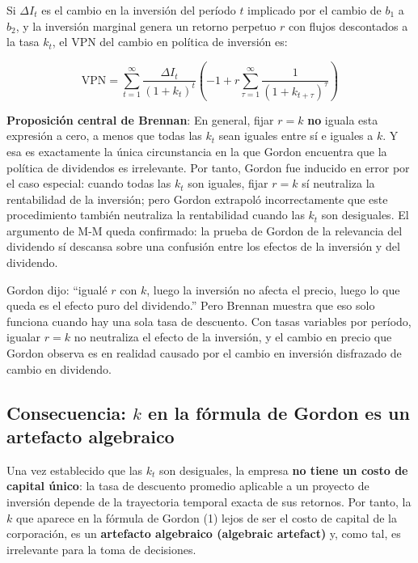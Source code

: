 \documentclass[12pt]{article}
\begin{document}
Si $\Delta I_t$ es el cambio en la inversi\'on del per\'iodo $t$ implicado por el cambio de $b_1$ a $b_2$, y la inversi\'on marginal genera un retorno perpetuo $r$ con flujos descontados a la tasa $k_t$, el VPN del cambio en pol\'itica de inversi\'on es:

\[
\text{VPN} = \sum_{t=1}^{\infty} \frac{\Delta I_t}{(1+k_t)^t}\left(-1 + r\sum_{\tau=1}^{\infty} \frac{1}{(1+k_{t+\tau})^{\tau}}\right)
\]

\begin{explicacion}
\textbf{Proposici\'on central de Brennan}: En general, fijar $r = k$ \textbf{no} iguala esta expresi\'on a cero, a menos que todas las $k_t$ sean iguales entre s\'i e iguales a $k$. Y esa es exactamente la \'unica circunstancia en la que Gordon encuentra que la pol\'itica de dividendos es irrelevante. Por tanto, Gordon fue inducido en error por el caso especial: cuando todas las $k_t$ son iguales, fijar $r = k$ s\'i neutraliza la rentabilidad de la inversi\'on; pero Gordon extrapoló incorrectamente que este procedimiento tambi\'en neutraliza la rentabilidad cuando las $k_t$ son desiguales. El argumento de M-M queda confirmado: la prueba de Gordon de la relevancia del dividendo s\'i descansa sobre una confusi\'on entre los efectos de la inversi\'on y del dividendo.
\end{explicacion}

\begin{intuicion}
Gordon dijo: ``igualé $r$ con $k$, luego la inversi\'on no afecta el precio, luego lo que queda es el efecto puro del dividendo.'' Pero Brennan muestra que eso solo funciona cuando hay una sola tasa de descuento. Con tasas variables por per\'iodo, igualar $r = k$ no neutraliza el efecto de la inversi\'on, y el cambio en precio que Gordon observa es en realidad causado por el cambio en inversi\'on disfrazado de cambio en dividendo.
\end{intuicion}

\subsection{Consecuencia: $k$ en la f\'ormula de Gordon es un artefacto algebraico}

Una vez establecido que las $k_t$ son desiguales, la empresa \textbf{no tiene un costo de capital \'unico}: la tasa de descuento promedio aplicable a un proyecto de inversi\'on depende de la trayectoria temporal exacta de sus retornos. Por tanto, la $k$ que aparece en la f\'ormula de Gordon (1) lejos de ser el costo de capital de la corporaci\'on, es un \textbf{artefacto algebraico (algebraic artefact)} y, como tal, es irrelevante para la toma de decisiones.
\end{document}
